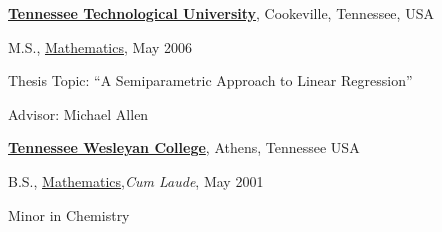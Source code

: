 \documentclass[10pt]{article}
\newenvironment{outerlist}[1][\enskip\textbullet]%
        {\begin{itemize}[#1]}{\end{itemize}%
         \vspace{-.6\baselineskip}}
\newenvironment{innerlist}[1][\enskip\textbullet]%
        {\begin{compactitem}[#1]}{\end{compactitem}}
\begin{document}
\href{http://www.tntech.edu/}{\textbf{Tennessee Technological University}}, 
Cookeville, Tennessee, USA
\begin{outerlist}
\item[] M.S., 
        \href{https://www.tntech.edu/cas/math/}
             {Mathematics}, May 2006
        \begin{innerlist}
        \item Thesis Topic: ``A Semiparametric Approach to Linear Regression''
        \item Advisor: {Michael Allen}\\
        \end{innerlist}

\end{outerlist}


\href{http://www.twcnet.edu/}{\textbf{Tennessee Wesleyan College}}, 
Athens, Tennessee USA
\begin{outerlist}
\item[] B.S., 
        \href{http://www.twcnet.edu/}
             {Mathematics},\emph{Cum Laude}, May 2001
        \begin{innerlist}        
        \item Minor in Chemistry
        \end{innerlist}
\end{outerlist}
\end{document}
